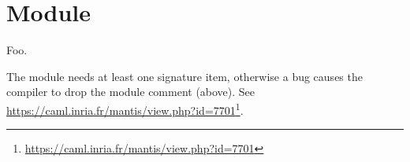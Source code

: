 \section{Module }\label{package-test+u+package+++ml-module-Module}%
Foo.

\label{package-test+u+package+++ml-module-Module-val-foo}\begin{ocamlindent}The module needs at least one signature item, otherwise a bug causes the compiler to drop the module comment (above). See \href{https://caml.inria.fr/mantis/view.php?id=7701}{https://caml.inria.fr/mantis/view.php?id=7701}\footnote{\url{https://caml.inria.fr/mantis/view.php?id=7701}}.\end{ocamlindent}%
\medbreak
